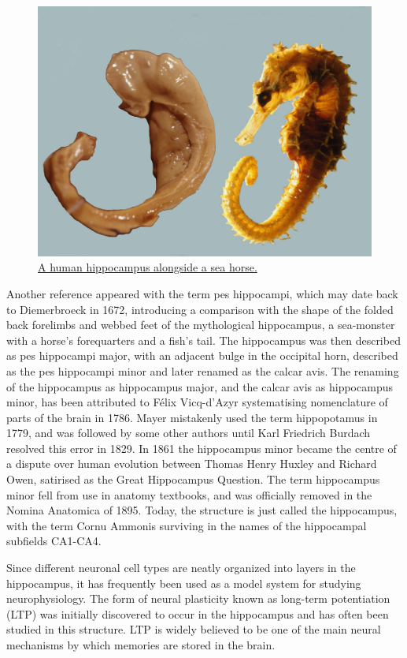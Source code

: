 \begin{figure}

{\centering \includegraphics[width=0.7\linewidth]{./figures/cns/Hippocampus_and_seahorse} 

}

\caption{\href{https://commons.wikimedia.org/wiki/File:Hippocampus_and_seahorse.JPG}{A human hippocampus alongside a sea horse.}}\label{fig:seahorse}
\end{figure}

Another reference appeared with the term pes hippocampi, which may date back to Diemerbroeck in 1672, introducing a comparison with the shape of the folded back forelimbs and webbed feet of the mythological hippocampus, a sea-monster with a horse's forequarters and a fish's tail. The hippocampus was then described as pes hippocampi major, with an adjacent bulge in the occipital horn, described as the pes hippocampi minor and later renamed as the calcar avis. The renaming of the hippocampus as hippocampus major, and the calcar avis as hippocampus minor, has been attributed to Félix Vicq-d'Azyr systematising nomenclature of parts of the brain in 1786. Mayer mistakenly used the term hippopotamus in 1779, and was followed by some other authors until Karl Friedrich Burdach resolved this error in 1829. In 1861 the hippocampus minor became the centre of a dispute over human evolution between Thomas Henry Huxley and Richard Owen, satirised as the Great Hippocampus Question. The term hippocampus minor fell from use in anatomy textbooks, and was officially removed in the Nomina Anatomica of 1895. Today, the structure is just called the hippocampus, with the term Cornu Ammonis surviving in the names of the hippocampal subfields CA1-CA4.

Since different neuronal cell types are neatly organized into layers in the hippocampus, it has frequently been used as a model system for studying neurophysiology. The form of neural plasticity known as long-term potentiation (LTP) was initially discovered to occur in the hippocampus and has often been studied in this structure. LTP is widely believed to be one of the main neural mechanisms by which memories are stored in the brain.




